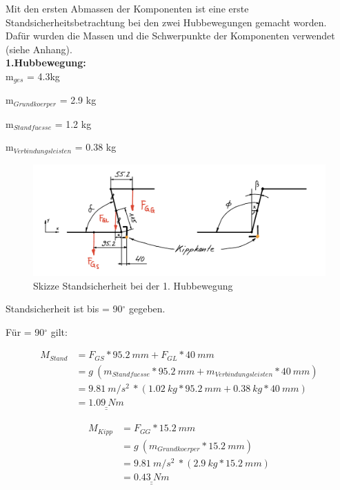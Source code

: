 Mit den ersten Abmassen der Komponenten ist eine erste Standsicherheitsbetrachtung bei den zwei Hubbewegungen gemacht worden. Dafür wurden die Massen und die Schwerpunkte der Komponenten verwendet (siehe Anhang).\\

\textbf{1.Hubbewegung:}\\

m$_{ges}$ = 4.3kg

m$_{Grundkoerper}$ = 2.9 kg

m$_{Standfuesse}$ = 1.2 kg

m$_{Verbindungsleisten}$ = 0.38 kg\\

\begin{figure}[H]
  \includegraphics[width=1\textwidth]{img/Treppensteigen/Standsicherheit 1.Hub.png}
  \centering
  \caption{Skizze Standsicherheit bei der 1. Hubbewegung}
\end{figure}

Standsicherheit ist bis {\alpha} = 90$^\circ$ gegeben.

Für {\alpha} = 90$^\circ$ gilt:


\begin{align*}
    M_{Stand} &= F_{GS} * 95.2\ mm + F_{GL} * 40\ mm \\
    &= g\ (m_{Standfuesse} * 95.2\ mm + m_{Verbindungsleisten} * 40\ mm) \\
    &= 9.81\ m/s^2\ * (1.02\ kg * 95.2\ mm + 0.38\ kg * 40\ mm) \\
    &= \underline{\underline{1.09\ Nm}}
\end{align*}

\begin{align*}
    M_{Kipp} &= F_{GG} * 15.2\ mm \\
    &= g\ (m_{Grundkoerper} * 15.2\ mm) \\
    &= 9.81\ m/s^2\ * (2.9\ kg * 15.2\ mm) \\
    &= \underline{\underline{0.43\ Nm}}
\end{align*}

